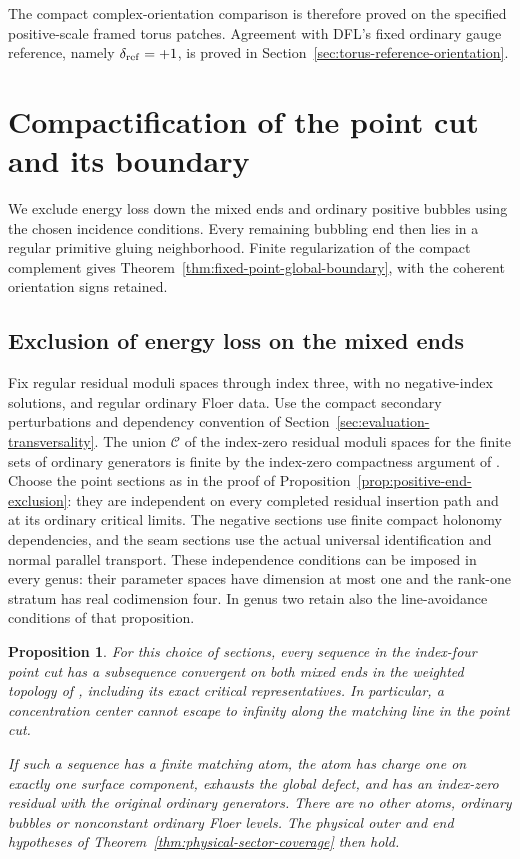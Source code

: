 \documentclass[11pt]{amsart}
\newtheorem{proposition}[theorem]{Proposition}
\theoremstyle{definition}
\theoremstyle{remark}
\theoremstyle{plain}
\begin{document}
The compact complex-orientation comparison is
therefore proved on the specified positive-scale
framed torus patches. Agreement with DFL's
fixed ordinary gauge reference, namely
$\delta_{\rm ref}=+1$, is proved in
Section~\ref{sec:torus-reference-orientation}.

\section{Compactification of the point cut and its boundary}
\label{sec:cut-compactification}

We exclude energy loss down the mixed ends and ordinary positive
bubbles using the chosen incidence conditions. Every remaining
bubbling end then lies in a regular primitive gluing neighborhood.
Finite regularization of the compact complement gives
Theorem~\ref{thm:fixed-point-global-boundary}, with the coherent
orientation signs retained.

\subsection{Exclusion of energy loss on the mixed ends}
\label{sec:mixed-end-exclusion}

Fix regular residual moduli spaces through index three, with
no negative-index solutions, and regular ordinary Floer data.
Use the compact secondary perturbations and dependency convention
of Section~\ref{sec:evaluation-transversality}.
The union $\mathcal C$ of the index-zero residual moduli spaces
for the finite sets of ordinary generators is finite by
the index-zero compactness argument of
\cite[Section~5.4]{DaeFukLip21a}.
Choose the point sections as in the proof of
Proposition~\ref{prop:positive-end-exclusion}: they are independent
on every completed residual insertion path and at its ordinary
critical limits. The negative sections use finite compact
holonomy dependencies, and the seam sections use the actual
universal identification and normal parallel transport.
These independence conditions can be imposed in every genus:
their parameter spaces have dimension at most one and the
rank-one stratum has real codimension four.
In genus two retain also the line-avoidance conditions of that
proposition.

\begin{proposition}\label{prop:mixed-end-exclusion}
For this choice of sections, every sequence in the index-four
point cut has a subsequence convergent on both mixed ends in
the weighted topology of \cite[equation~(5.36)]{DaeFukLip21a},
including its exact critical representatives.
In particular, a concentration center cannot escape to infinity
along the matching line in the point cut.

If such a sequence has a finite matching atom, the atom has
charge one on exactly one surface component, exhausts the
global defect, and has an index-zero residual with the original
ordinary generators. There are no other atoms, ordinary bubbles
or nonconstant ordinary Floer levels. The physical outer and
end hypotheses of
Theorem~\ref{thm:physical-sector-coverage} then hold.
\end{proposition}
\end{document}
